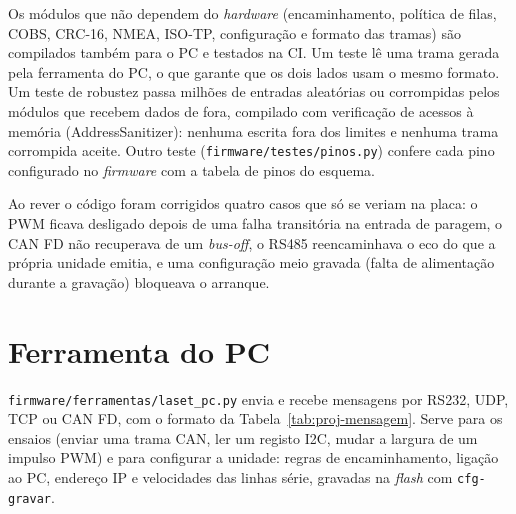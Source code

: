 Os módulos que não dependem do \textit{hardware} (encaminhamento, política de
filas, COBS, CRC-16, NMEA, ISO-TP, configuração e formato das tramas) são
compilados também para o PC e testados na CI. Um teste lê uma trama gerada
pela ferramenta do PC, o que garante que os dois lados usam o mesmo formato.
Um teste de robustez passa milhões de entradas aleatórias ou corrompidas pelos
módulos que recebem dados de fora, compilado com verificação de acessos à memória
(AddressSanitizer): nenhuma escrita fora dos limites e nenhuma trama corrompida
aceite. Outro teste (\texttt{firmware/testes/pinos.py}) confere cada pino
configurado no \textit{firmware} com a tabela de pinos do esquema.

Ao rever o código foram corrigidos quatro casos que só se veriam na placa: o PWM
ficava desligado depois de uma falha transitória na entrada de paragem, o CAN FD
não recuperava de um \textit{bus-off}, o RS485 reencaminhava o eco do que a própria
unidade emitia, e uma configuração meio gravada (falta de alimentação durante a
gravação) bloqueava o arranque.

\section{Ferramenta do PC}

\texttt{firmware/ferramentas/laset\_pc.py} envia e recebe mensagens por RS232,
UDP, TCP ou CAN FD, com o formato da Tabela~\ref{tab:proj-mensagem}. Serve
para os ensaios (enviar uma trama CAN, ler um registo I2C, mudar a largura
de um impulso PWM) e para configurar a unidade: regras de encaminhamento,
ligação ao PC, endereço IP e velocidades das linhas série, gravadas na
\textit{flash} com \texttt{cfg-gravar}.
